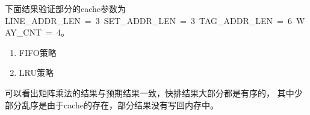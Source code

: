 \documentclass[UTF8]{article}
\begin{document}
    下面结果验证部分的cache参数为{\jetbrains LINE\_ADDR\_LEN\ =\ 3\ SET\_ADDR\_LEN\ =\ 3\ TAG\_ADDR\_LEN\ =\ 6\ WAY\_CNT\ =\ 4}。
    \begin{enumerate}[label=(\arabic*)]
        \item FIFO策略
        \begin{figure}[H]
            \centering
        \end{figure}
        \item LRU策略
        \begin{figure}[H]
            \centering
        \end{figure}
    \end{enumerate}
    可以看出矩阵乘法的结果与预期结果一致，快排结果大部分都是有序的，
    其中少部分乱序是由于cache的存在，部分结果没有写回内存中。
\end{document}
